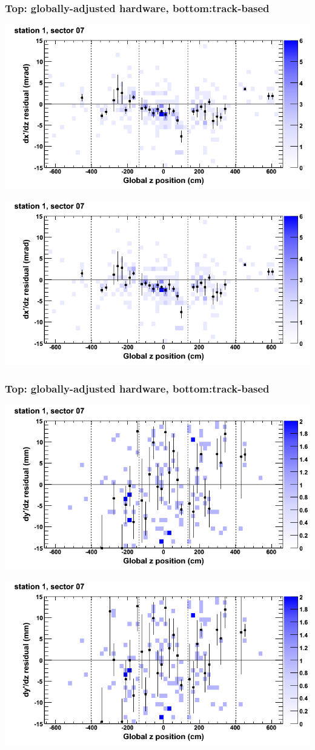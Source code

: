 \documentclass[compress]{beamer}
\begin{document}
\begin{frame}
\frametitle{Top: globally-adjusted hardware, bottom:track-based}
\includegraphics[width=0.7\linewidth]{NOV4_mapplots_HW/DTvsz_st1sec07_dxdz.png}

\includegraphics[width=0.7\linewidth]{NOV4_mapplots/DTvsz_st1sec07_dxdz.png}
\end{frame}

\begin{frame}
\frametitle{Top: globally-adjusted hardware, bottom:track-based}
\includegraphics[width=0.7\linewidth]{NOV4_mapplots_HW/DTvsz_st1sec07_dydz.png}

\includegraphics[width=0.7\linewidth]{NOV4_mapplots/DTvsz_st1sec07_dydz.png}
\end{frame}
\end{document}

